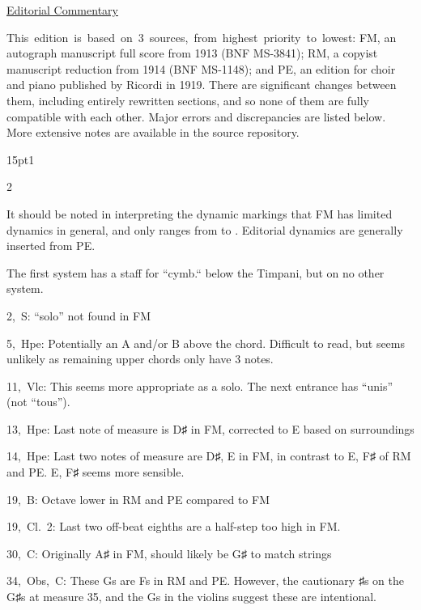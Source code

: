 \documentclass[twoside]{article}
\newcommand\dynmark[1]{\scalebox{0.9}{#1}{\kern1pt}}
\begin{document}
\begin{center}
\underline{\huge{Editorial Commentary}}
\end{center}

\mbox{This edition is based on 3 sources, from highest priority to lowest}: FM, an autograph manuscript full score from 1913 (BNF MS-3841); RM, a copyist manuscript reduction from 1914 (BNF MS-1148); and PE, an edition for choir and piano published by Ricordi in 1919. There are significant changes between them, including entirely rewritten sections, and so none of them are fully compatible with each other. Major errors and discrepancies are listed below. More extensive notes are available in the source repository.

\begin{hangparas}{15pt}{1}
\begin{multicols}{2}

It should be noted in interpreting the dynamic markings that FM has limited dynamics in general, and only ranges from \dynmark{\ppp} to \dynmark{\mf}. Editorial dynamics are generally inserted from PE.

The first system has a staff for ``cymb.`` below the Timpani, but on no other system.

\mbox{2, S}: ``solo'' not found in FM

\mbox{5, Hpe}: Potentially an A and/or B above the chord. Difficult to read, but seems unlikely as remaining upper chords only have 3 notes.

\mbox{11, Vlc}: This seems more appropriate as a solo. The next entrance has ``unis'' (not ``tous'').

\mbox{13, Hpe}: Last note of measure is D♯ in FM, corrected to E based on surroundings

\mbox{14, Hpe}: Last two notes of measure are D♯, E in FM, in contrast to E, F♯ of RM and PE. E, F♯ seems more sensible.

\mbox{19, B}: Octave lower in RM and PE compared to FM

\mbox{19, \mbox{Cl.~2}}: Last two off-beat eighths are a half-step too high in FM.

\mbox{30, C}: Originally A♯ in FM, should likely be G♯ to match strings

\mbox{34, Obs, C}: These G\scalebox{1.5}{\musDoubleSharp}s are F\scalebox{1.5}{\musDoubleSharp}s in RM and PE. However, the cautionary ♯s on the G♯s at measure 35, and the G\scalebox{1.5}{\musDoubleSharp}s in the violins suggest these are intentional.


\end{multicols}
\end{hangparas}
\end{document}
